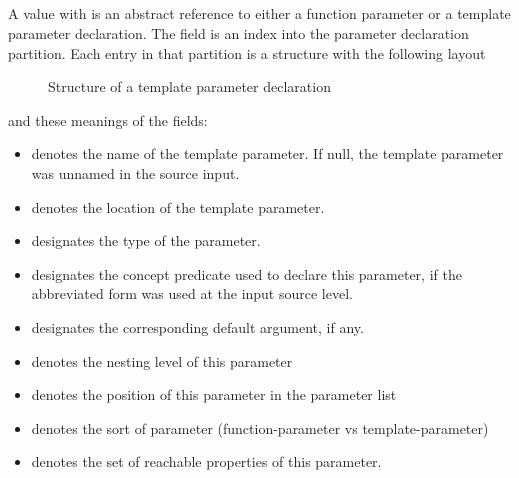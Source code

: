 

\subsection{}
\label{sec:ifc:DeclSort:Parameter}

A  value with   is an abstract reference to 
either a function parameter or a template parameter declaration.
The  field is an index into the parameter declaration partition.  
Each entry in that partition is a structure with the following layout
%
\begin{figure}[H]
	\centering
	\caption{Structure of a template parameter declaration}
	\label{fig:ifc-template-parameter-structure}
\end{figure}
%
and these meanings of the fields:
\begin{itemize}
	\item {} denotes the name of the template parameter.  If null, the template parameter was unnamed in the source input.
	\item {} denotes the location of the template parameter.
	\item {} designates the type of the parameter.
	\item {} designates the concept predicate used to declare this parameter, if the abbreviated form was used at the input source level.
	\item {} designates the corresponding default argument, if any.
	\item {} denotes the nesting level of this parameter
	\item {} denotes the position of this parameter in the parameter list
	\item {} denotes the sort of parameter (function-parameter vs template-parameter)
	\item {} denotes the set of reachable properties of this parameter.
\end{itemize}

